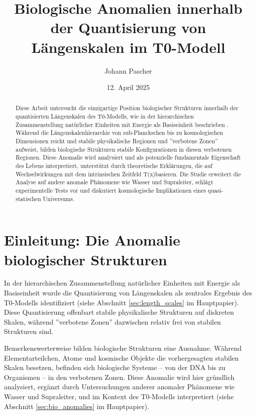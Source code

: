 \documentclass[12pt,a4paper]{article}
\title{Biologische Anomalien innerhalb der Quantisierung von Längenskalen im T0-Modell}
\author{Johann Pascher}
\date{12. April 2025}
\newcommand{\Tfield}{T(x)}
\begin{document}
	
	\maketitle
	
	\begin{abstract}
		Diese Arbeit untersucht die einzigartige Position biologischer Strukturen innerhalb der quantisierten Längenskalen des T0-Modells, wie in der hierarchischen Zusammenstellung natürlicher Einheiten mit Energie als Basiseinheit beschrieben \cite{pascher_alphabeta_2025}. Während die Längenskalenhierarchie von sub-Planckschen bis zu kosmologischen Dimensionen reicht und stabile physikalische Regionen und ''verbotene Zonen'' aufweist, bilden biologische Strukturen stabile Konfigurationen in diesen verbotenen Regionen. Diese Anomalie wird analysiert und als potenzielle fundamentale Eigenschaft des Lebens interpretiert, unterstützt durch theoretische Erklärungen, die auf Wechselwirkungen mit dem intrinsischen Zeitfeld \Tfield basieren. Die Studie erweitert die Analyse auf andere anomale Phänomene wie Wasser und Supraleiter, schlägt experimentelle Tests vor und diskutiert kosmologische Implikationen eines quasi-statischen Universums.
	\end{abstract}
	
	\tableofcontents
	\newpage
	
	\section{Einleitung: Die Anomalie biologischer Strukturen}
	\label{sec:introduction}
	
	In der hierarchischen Zusammenstellung natürlicher Einheiten mit Energie als Basiseinheit \cite{pascher_alphabeta_2025} wurde die Quantisierung von Längenskalen als zentrales Ergebnis des T0-Modells identifiziert (siehe Abschnitt \ref{sec:length_scales} im Hauptpapier). Diese Quantisierung offenbart stabile physikalische Strukturen auf diskreten Skalen, während ''verbotene Zonen'' dazwischen relativ frei von stabilen Strukturen sind.
	
	Bemerkenswerterweise bilden biologische Strukturen eine Ausnahme. Während Elementarteilchen, Atome und kosmische Objekte die vorhergesagten stabilen Skalen besetzen, befinden sich biologische Systeme – von der DNA bis zu Organismen – in den verbotenen Zonen. Diese Anomalie wird hier gründlich analysiert, ergänzt durch Untersuchungen anderer anomaler Phänomene wie Wasser und Supraleiter, und im Kontext des T0-Modells interpretiert (siehe Abschnitt \ref{sec:bio_anomalies} im Hauptpapier).
	
\end{document}
